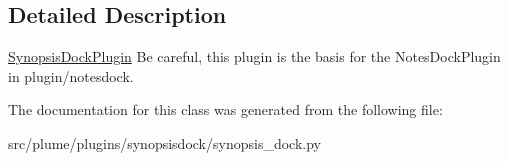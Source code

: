\subsection{Detailed Description}
\hyperlink{classplume-creator_1_1src_1_1plume_1_1plugins_1_1synopsisdock_1_1synopsis__dock_1_1_synopsis_dock_plugin}{Synopsis\+Dock\+Plugin} Be careful, this plugin is the basis for the Notes\+Dock\+Plugin in plugin/notesdock. 

The documentation for this class was generated from the following file\+:\begin{DoxyCompactItemize}
\item 
src/plume/plugins/synopsisdock/synopsis\+\_\+dock.\+py\end{DoxyCompactItemize}
